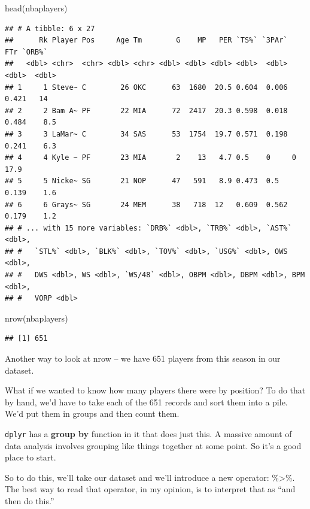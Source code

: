 \documentclass[
]{book}
\newenvironment{Shaded}{\begin{snugshade}}{\end{snugshade}}
\newcommand{\FunctionTok}[1]{\textcolor[rgb]{0.00,0.00,0.00}{#1}}
\newcommand{\NormalTok}[1]{#1}
\begin{document}
\begin{Shaded}
\begin{Highlighting}[]
\FunctionTok{head}\NormalTok{(nbaplayers)}
\end{Highlighting}
\end{Shaded}

\begin{verbatim}
## # A tibble: 6 x 27
##      Rk Player Pos     Age Tm        G    MP   PER `TS%` `3PAr`   FTr `ORB%`
##   <dbl> <chr>  <chr> <dbl> <chr> <dbl> <dbl> <dbl> <dbl>  <dbl> <dbl>  <dbl>
## 1     1 Steve~ C        26 OKC      63  1680  20.5 0.604  0.006 0.421   14  
## 2     2 Bam A~ PF       22 MIA      72  2417  20.3 0.598  0.018 0.484    8.5
## 3     3 LaMar~ C        34 SAS      53  1754  19.7 0.571  0.198 0.241    6.3
## 4     4 Kyle ~ PF       23 MIA       2    13   4.7 0.5    0     0       17.9
## 5     5 Nicke~ SG       21 NOP      47   591   8.9 0.473  0.5   0.139    1.6
## 6     6 Grays~ SG       24 MEM      38   718  12   0.609  0.562 0.179    1.2
## # ... with 15 more variables: `DRB%` <dbl>, `TRB%` <dbl>, `AST%` <dbl>,
## #   `STL%` <dbl>, `BLK%` <dbl>, `TOV%` <dbl>, `USG%` <dbl>, OWS <dbl>,
## #   DWS <dbl>, WS <dbl>, `WS/48` <dbl>, OBPM <dbl>, DBPM <dbl>, BPM <dbl>,
## #   VORP <dbl>
\end{verbatim}

\begin{Shaded}
\begin{Highlighting}[]
\FunctionTok{nrow}\NormalTok{(nbaplayers)}
\end{Highlighting}
\end{Shaded}

\begin{verbatim}
## [1] 651
\end{verbatim}

Another way to look at nrow -- we have 651 players from this season in our dataset.

What if we wanted to know how many players there were by position? To do that by hand, we'd have to take each of the 651 records and sort them into a pile. We'd put them in groups and then count them.

\texttt{dplyr} has a \textbf{group by} function in it that does just this. A massive amount of data analysis involves grouping like things together at some point. So it's a good place to start.

So to do this, we'll take our dataset and we'll introduce a new operator: \%\textgreater\%. The best way to read that operator, in my opinion, is to interpret that as ``and then do this.''
\end{document}
